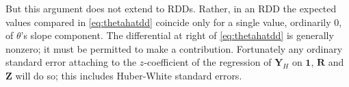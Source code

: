 But this argument does not extend to RDDs.  Rather, in an RDD the
expected values compared in \eqref{eq:thetahatdd} coincide only for a
single value, ordinarily 0, of $\theta$'s slope component.  The
differential at right of
\eqref{eq:thetahatdd} is generally nonzero; it must be permitted to
make a contribution. Fortunately any ordinary standard error attaching
to the $z$-coefficient of the regression of ${\mathbf{Y}_{H}}$ on
$\mathbf{1}$, $\mathbf{R}$ and $\mathbf{Z}$ will do so; this includes
Huber-White standard errors.





